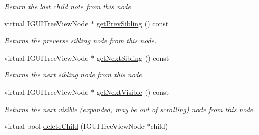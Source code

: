 \begin{DoxyCompactItemize}
\begin{DoxyCompactList}\small\item\em Return the last child note from this node. \end{DoxyCompactList}\item 
\hypertarget{classirr_1_1gui_1_1_c_g_u_i_tree_view_node_a1ccec753bb96e84ea4539c8ce931e0d7}{virtual I\-G\-U\-I\-Tree\-View\-Node $\ast$ \hyperlink{classirr_1_1gui_1_1_c_g_u_i_tree_view_node_a1ccec753bb96e84ea4539c8ce931e0d7}{get\-Prev\-Sibling} () const }\label{classirr_1_1gui_1_1_c_g_u_i_tree_view_node_a1ccec753bb96e84ea4539c8ce931e0d7}

\begin{DoxyCompactList}\small\item\em Returns the preverse sibling node from this node. \end{DoxyCompactList}\item 
\hypertarget{classirr_1_1gui_1_1_c_g_u_i_tree_view_node_a49f0a4d36e9d912854ccf624bdde229a}{virtual I\-G\-U\-I\-Tree\-View\-Node $\ast$ \hyperlink{classirr_1_1gui_1_1_c_g_u_i_tree_view_node_a49f0a4d36e9d912854ccf624bdde229a}{get\-Next\-Sibling} () const }\label{classirr_1_1gui_1_1_c_g_u_i_tree_view_node_a49f0a4d36e9d912854ccf624bdde229a}

\begin{DoxyCompactList}\small\item\em Returns the next sibling node from this node. \end{DoxyCompactList}\item 
\hypertarget{classirr_1_1gui_1_1_c_g_u_i_tree_view_node_a82c6c2f4609c7fea072a0633113c11c0}{virtual I\-G\-U\-I\-Tree\-View\-Node $\ast$ \hyperlink{classirr_1_1gui_1_1_c_g_u_i_tree_view_node_a82c6c2f4609c7fea072a0633113c11c0}{get\-Next\-Visible} () const }\label{classirr_1_1gui_1_1_c_g_u_i_tree_view_node_a82c6c2f4609c7fea072a0633113c11c0}

\begin{DoxyCompactList}\small\item\em Returns the next visible (expanded, may be out of scrolling) node from this node. \end{DoxyCompactList}\item 
\hypertarget{classirr_1_1gui_1_1_c_g_u_i_tree_view_node_a2864e29dd739c0f8c9971e598a564bbd}{virtual bool \hyperlink{classirr_1_1gui_1_1_c_g_u_i_tree_view_node_a2864e29dd739c0f8c9971e598a564bbd}{delete\-Child} (I\-G\-U\-I\-Tree\-View\-Node $\ast$child)}\label{classirr_1_1gui_1_1_c_g_u_i_tree_view_node_a2864e29dd739c0f8c9971e598a564bbd}


\end{DoxyCompactItemize}
